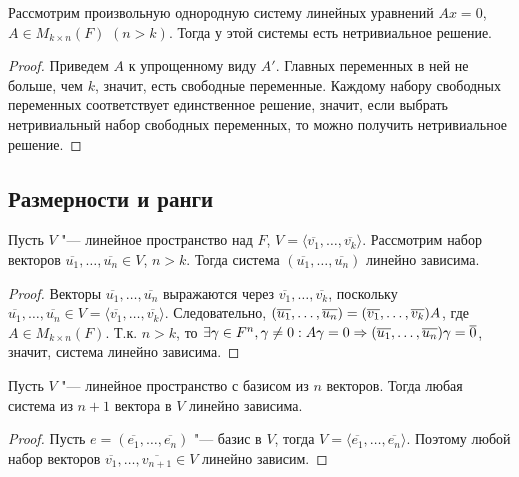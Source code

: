 \begin{proposition}
	Рассмотрим произвольную однородную систему линейных уравнений $Ax = 0$, $A \in M_{k \times n}(F)$ $(n > k)$. Тогда у этой системы есть нетривиальное решение.
\end{proposition}

\begin{proof}
	Приведем $A$ к упрощенному виду $A'$. Главных переменных в ней не больше, чем $k$, значит, есть свободные переменные. Каждому набору свободных переменных соответствует единственное решение, значит, если выбрать нетривиальный набор свободных переменных, то можно получить нетривиальное решение.
\end{proof}

\subsection{Размерности и ранги}

\begin{theorem}
	Пусть $V$ "--- линейное пространство над $F$, $V = \langle\overline{v_1}, \dots, \overline{v_k}\rangle$. Рассмотрим набор векторов $\overline{u_1}, \dots, \overline{u_n} \in V$, $n > k$. Тогда система $(\overline{u_1}, \dots, \overline{u_n})$ линейно зависима.
\end{theorem}

\begin{proof}
	Векторы $\overline{u_1}, \dots, \overline{u_n}$ выражаются через $\overline{v_1}, \dots, \overline{v_k}$, поскольку $\overline{u_1}, \dots, \overline{u_n} \in V = \langle\overline{v_1}, \dots, \overline{v_k}\rangle$. Следовательно, $(\overline{u_1}, \dots, \overline{u_n}) \hm{=} (\overline{v_1}, \dots, \overline{v_k})A$, где $A \in M_{k \times n}(F)$. Т.\:к. $n > k$, то $\exists \gamma \hm{\in} F^n, \gamma \ne 0: A\gamma = 0 \Rightarrow (\overline{u_1}, \dots, \overline{u_n})\gamma = \overline{0}$, значит, система линейно зависима.
\end{proof}

\begin{corollary}
	Пусть $V$ "--- линейное пространство с базисом из $n$ векторов. Тогда любая система из $n + 1$ вектора в $V$ линейно зависима.
\end{corollary}

\begin{proof}
	Пусть $e = (\overline{e_1}, \dots, \overline{e_n})$ "--- базис в $V$, тогда $V = \langle\overline{e_1}, \dots, \overline{e_n}\rangle$. Поэтому любой набор векторов $\overline{v_1}, \dots, \overline{v_{n+1}} \in V$ линейно зависим.
\end{proof}

